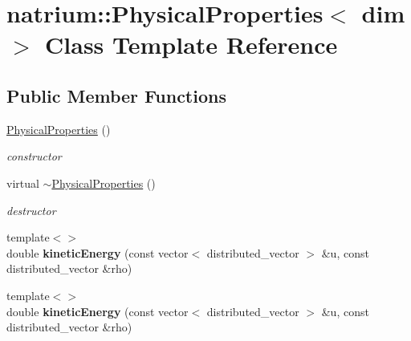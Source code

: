 \hypertarget{classnatrium_1_1PhysicalProperties}{\section{natrium\-:\-:Physical\-Properties$<$ dim $>$ Class Template Reference}
\label{classnatrium_1_1PhysicalProperties}
}
\subsection*{Public Member Functions}
\begin{DoxyCompactItemize}
\item 
\hypertarget{classnatrium_1_1PhysicalProperties_a5047491de09441e2aae00f6ba838f99e}{\hyperlink{classnatrium_1_1PhysicalProperties_a5047491de09441e2aae00f6ba838f99e}{Physical\-Properties} ()}\label{classnatrium_1_1PhysicalProperties_a5047491de09441e2aae00f6ba838f99e}

\begin{DoxyCompactList}\small\item\em constructor \end{DoxyCompactList}\item 
\hypertarget{classnatrium_1_1PhysicalProperties_a1089bbb66f56e8c31cdb2908d5b08757}{virtual \hyperlink{classnatrium_1_1PhysicalProperties_a1089bbb66f56e8c31cdb2908d5b08757}{$\sim$\-Physical\-Properties} ()}\label{classnatrium_1_1PhysicalProperties_a1089bbb66f56e8c31cdb2908d5b08757}

\begin{DoxyCompactList}\small\item\em destructor \end{DoxyCompactList}\item 
\hypertarget{classnatrium_1_1PhysicalProperties_a2afe3d56305d9014017f23846b376e9c}{{\footnotesize template$<$$>$ }\\double {\bfseries kinetic\-Energy} (const vector$<$ distributed\-\_\-vector $>$ \&u, const distributed\-\_\-vector \&rho)}\label{classnatrium_1_1PhysicalProperties_a2afe3d56305d9014017f23846b376e9c}

\item 
\hypertarget{classnatrium_1_1PhysicalProperties_ad184e3f45c0ce6b3d2ce499385ba38a1}{{\footnotesize template$<$$>$ }\\double {\bfseries kinetic\-Energy} (const vector$<$ distributed\-\_\-vector $>$ \&u, const distributed\-\_\-vector \&rho)}\label{classnatrium_1_1PhysicalProperties_ad184e3f45c0ce6b3d2ce499385ba38a1}

\end{DoxyCompactItemize}
